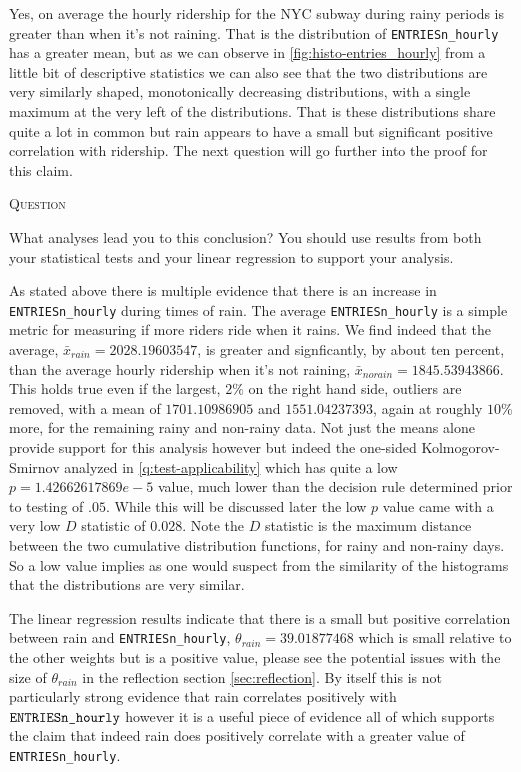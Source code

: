 \documentclass{article}
\newcounter{questionCtr}
\newenvironment{question}{%
   \bigskip\noindent%
   \refstepcounter{questionCtr}%
   \textsc{Question \thequestionCtr}%
   \newline%
   }{\par\bigskip}  %
\numberwithin{questionCtr}{section}
\numberwithin{problemCtr}{section}
\begin{document}
Yes, on average the hourly ridership for the NYC subway during rainy periods is
greater than when it's not raining.  That is the distribution of
\verb|ENTRIESn_hourly| has a greater mean, but as we can observe in
\autoref{fig:histo-entries_hourly} from a little bit of descriptive statistics
we can also see that the two distributions are very similarly shaped,
monotonically decreasing distributions, with a single maximum at the very left
of the distributions.  That is these distributions share quite a lot in common
but rain appears to have a small but significant positive correlation with
ridership. The next question will go further into the proof for this claim.

\begin{question}
  What analyses lead you to this conclusion? You should use results from both
  your statistical tests and your linear regression to support your analysis.
\end{question}

As stated above there is multiple evidence that there is an increase in
\verb|ENTRIESn_hourly| during times of rain. The average \verb|ENTRIESn_hourly|
is a simple metric for measuring if more riders ride when it rains.  We find
indeed that the average, $\bar{x}_{rain} = 2028.19603547$, is greater and
signficantly, by about ten percent, than the average hourly ridership when it's
not raining, $\bar{x}_{norain} = 1845.53943866$.  This holds true even if the
largest, $2\%$ on the right hand side, outliers are removed, with a mean of
$1701.10986905$ and $1551.04237393$, again at roughly $10\%$ more, for the
remaining rainy and non-rainy data.  Not just the means alone provide support
for this analysis however but indeed the one-sided Kolmogorov-Smirnov analyzed
in \autoref{q:test-applicability} which has quite a low $p = 1.42662617869e-5$
value, much lower than the decision rule determined prior to testing of $.05$.
While this will be discussed later the low $p$ value came with a very low $D$
statistic of $0.028$. Note the $D$ statistic is the maximum distance between the
two cumulative distribution functions, for rainy and non-rainy days.  So a low
value implies as one would suspect from the similarity of the histograms that
the distributions are very similar.  

The linear regression results indicate that there is a small but positive
correlation between rain and \verb|ENTRIESn_hourly|, $\theta_{rain} =
39.01877468$ which is small relative to the other weights but is a positive
value, please see the potential issues with the size of $\theta_{rain}$ in the
reflection section \autoref{sec:reflection}.  By itself this is not 
particularly strong evidence that rain correlates positively with
$\verb|ENTRIESn_hourly|$ however it is a useful piece of evidence all of which
supports the claim that indeed rain does positively correlate with a greater
value of \verb|ENTRIESn_hourly|.
\end{document}
